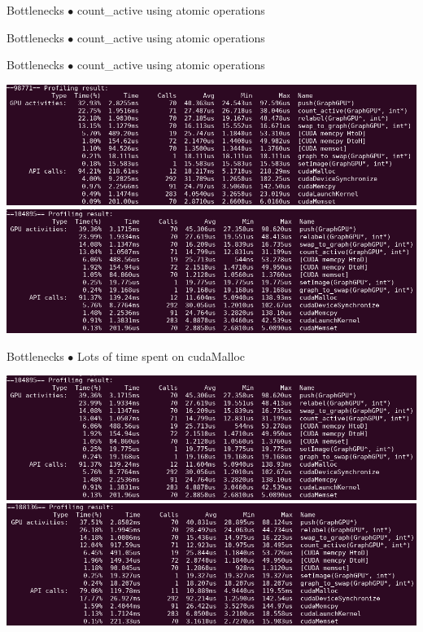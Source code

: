 \documentclass[10pt]{beamer}
\begin{document}
\begin{frame}{Bottlenecks}
$\bullet$ count\_active using atomic operations \\
\end{frame}

\begin{frame}{Bottlenecks}
$\bullet$ count\_active using atomic operations \\

\end{frame}

\begin{frame}{Bottlenecks}
$\bullet$ count\_active using atomic operations \\
    \begin{center}
        \includegraphics[scale=0.4]{../pics/gpu_prof1_cut.png}
        \includegraphics[scale=0.4]{../pics/gpu_prof2_cut.png}
    \end{center}
\end{frame}

\begin{frame}{Bottlenecks}
$\bullet$ Lots of time spent on cudaMalloc \\
    \begin{center}
        \includegraphics[scale=0.4]{../pics/gpu_prof2_cut.png}
        \includegraphics[scale=0.4]{../pics/gpu_prof3_cut.png}
    \end{center}
\end{frame}
\end{document}
